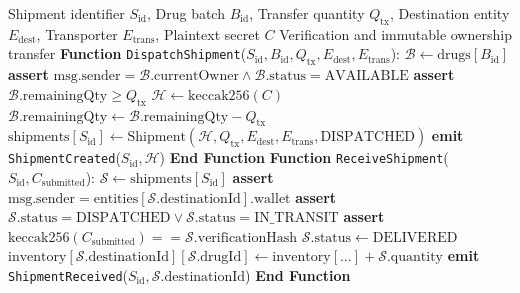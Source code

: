 \documentclass[pdflatex,sn-mathphys-num]{sn-jnl}
\theoremstyle{thmstyleone}
\theoremstyle{thmstyletwo}
\theoremstyle{thmstylethree}
\begin{document}
\begin{algorithm}[ht]
\caption{Zero-Trust Cryptographic Delivery Handoff and Inventory Settlement}\label{alg:handoff}
\begin{algorithmic}[1]
\Require Shipment identifier $S_{\text{id}}$, Drug batch $B_{\text{id}}$, Transfer quantity $Q_{\text{tx}}$, Destination entity $E_{\text{dest}}$, Transporter $E_{\text{trans}}$, Plaintext secret $C$
\Ensure Verification and immutable ownership transfer
\State \textbf{Function} \texttt{DispatchShipment}($S_{\text{id}}, B_{\text{id}}, Q_{\text{tx}}, E_{\text{dest}}, E_{\text{trans}}$):
\State \quad $\mathcal{B} \gets \text{drugs}[B_{\text{id}}]$
\State \quad \textbf{assert} $\text{msg.sender} = \mathcal{B}.\text{currentOwner} \land \mathcal{B}.\text{status} = \text{AVAILABLE}$
\State \quad \textbf{assert} $\mathcal{B}.\text{remainingQty} \ge Q_{\text{tx}}$
\State \quad $\mathcal{H} \gets \text{keccak256}(C)$
\State \quad $\mathcal{B}.\text{remainingQty} \gets \mathcal{B}.\text{remainingQty} - Q_{\text{tx}}$
\State \quad $\text{shipments}[S_{\text{id}}] \gets \text{Shipment}(\mathcal{H}, Q_{\text{tx}}, E_{\text{dest}}, E_{\text{trans}}, \text{DISPATCHED})$
\State \quad \textbf{emit} \texttt{ShipmentCreated}($S_{\text{id}}, \mathcal{H}$)
\State \textbf{End Function}
\Statex
\State \textbf{Function} \texttt{ReceiveShipment}($S_{\text{id}}, C_{\text{submitted}}$):
\State \quad $\mathcal{S} \gets \text{shipments}[S_{\text{id}}]$
\State \quad \textbf{assert} $\text{msg.sender} = \text{entities}[\mathcal{S}.\text{destinationId}].\text{wallet}$
\State \quad \textbf{assert} $\mathcal{S}.\text{status} = \text{DISPATCHED} \lor \mathcal{S}.\text{status} = \text{IN\_TRANSIT}$
\State \quad \textbf{assert} $\text{keccak256}(C_{\text{submitted}}) == \mathcal{S}.\text{verificationHash}$
\State \quad $\mathcal{S}.\text{status} \gets \text{DELIVERED}$
\State \quad $\text{inventory}[\mathcal{S}.\text{destinationId}][\mathcal{S}.\text{drugId}] \gets \text{inventory}[\dots] + \mathcal{S}.\text{quantity}$
\State \quad \textbf{emit} \texttt{ShipmentReceived}($S_{\text{id}}, \mathcal{S}.\text{destinationId}$)
\State \textbf{End Function}
\end{algorithmic}
\end{algorithm}
\end{document}
